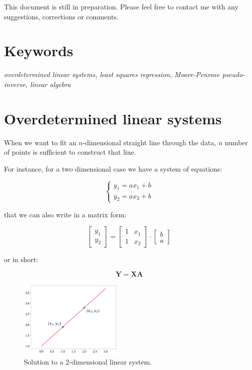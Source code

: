 \documentclass[10pt,twocolumn]{article}
\begin{document}
This document is still in preparation. Please feel free to contact me with any suggestions, corrections or comments.

\section*{Keywords}

\textit{overdetermined linear systems, least squares regression, Moore-Penrose pseudo-inverse, linear algebra}

\tableofcontents


\section{Overdetermined linear systems}

When we want to fit an $n$-dimensional straight line through the data, $n$ number of points is sufficient to construct that line.

For instance, for a two dimensional case we have a system of equations:

\begin{equation}
\begin{cases}
y_1 = a x_1 + b \\
y_2 = a x_2 + b
\end{cases}
\end{equation}

that we can also write in a matrix form:

\begin{equation}
\begin{bmatrix}
y_1 \\
y_2
\end{bmatrix}
=
\begin{bmatrix}
1 & x_1 \\
1 & x_2
\end{bmatrix}
\cdot
\begin{bmatrix}
b \\
a
\end{bmatrix}
\end{equation}

or in short:

\begin{equation} \label{eq:general_linear_equation}
\bm{Y} = \bm{X}\bm{A}
\end{equation}

\begin{figure}[H]
\centering\includegraphics[width=5cm]{overdetermined-systems-figure-1.png}
\caption{Solution to a 2-dimensional linear system.}
\label{fig:linear-system-solution}
\end{figure}
\end{document}
